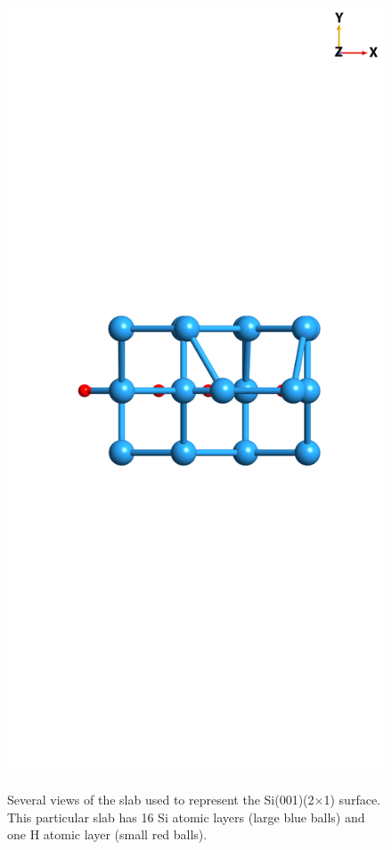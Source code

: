 {\begin{figure}
\begin{minipage}[b]{0.31\textwidth}
        \label{fig:2x1side}
    \end{minipage}
    \begin{minipage}[b]{0.31\textwidth}
        \centering
        \includegraphics[width=\textwidth]{figures/source/structure/Si2x1-top}
        \label{fig:2x1top}
    \end{minipage}
    \caption{Several views of the slab used to represent the Si(001)(2$\times$1)
    surface. This particular slab has 16 Si atomic layers (large blue balls) and
    one H atomic layer (small red balls).}
    \label{fig:2x1struc}
\end{figure}

}
